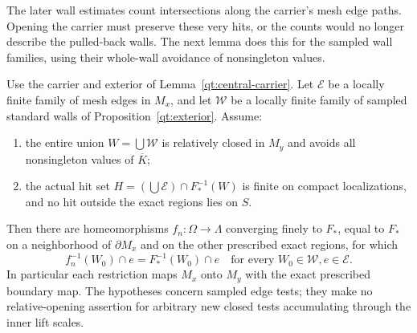 The later wall estimates count intersections along the carrier's mesh
edge paths.  Opening the carrier must preserve these very hits, or the
counts would no longer describe the pulled-back walls.  The next lemma
does this for the sampled wall families, using their whole-wall
avoidance of nonsingleton values.

\begin{lemma}
\label{qt:edge-matching}
Use the carrier and exterior of Lemma~\ref{qt:central-carrier}.
Let $\mathcal E$ be a locally finite family of mesh edges in $M_x$,
and let $\mathcal W$ be a locally finite family of sampled standard
walls of Proposition~\ref{qt:exterior}.  Assume:
\begin{enumerate}
\item the entire union $W=\bigcup\mathcal W$ is relatively closed
in $M_y$ and avoids all nonsingleton values of $\overline K$;
\item the actual hit set
$H=(\bigcup\mathcal E)\cap F_*^{-1}(W)$ is finite on compact
localizations, and no hit outside the exact regions lies on $S$.
\end{enumerate}
Then there are homeomorphisms $f_n:\Omega\to\Lambda$ converging
finely to $F_*$, equal to $F_*$ on a neighborhood of $\partial M_x$
and on the other prescribed exact regions, for which
\[
 f_n^{-1}(W_0)\cap e=F_*^{-1}(W_0)\cap e
 \quad\text{for every }W_0\in\mathcal W, e\in\mathcal E.
\]
In particular each restriction maps $M_x$ onto $M_y$ with the exact
prescribed boundary map.  The hypotheses concern sampled edge
tests; they make no relative-opening assertion for arbitrary new
closed tests accumulating through the inner lift scales.
\end{lemma}

